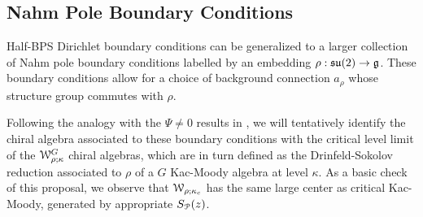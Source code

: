 \documentclass[11pt,a4paper]{article}
\begin{document}
%

\subsection{Nahm Pole Boundary Conditions}\label{nbc}

Half-BPS Dirichlet boundary conditions can be generalized to a larger collection of Nahm pole boundary conditions labelled by an embedding 
$\rho:\mathfrak{su}(2)\to{\mathfrak g}$. These boundary conditions allow for a choice of background connection $a_\rho$ whose structure group commutes with $\rho$. 

Following the analogy with the $\Psi \neq 0$ results in \cite{Gaiotto:2017euk}, we will tentatively identify the chiral algebra 
associated to these boundary conditions with the critical level limit of the ${\cal W}^G_{\rho;\kappa}$ chiral algebras, 
which are in turn defined as the Drinfeld-Sokolov reduction associated to $\rho$ of a $G$ Kac-Moody algebra at level $\kappa$. 
As a basic check of this proposal, we observe that ${\cal W}_{\rho;\kappa_c}$ has the same large center as critical Kac-Moody, 
generated by appropriate $S_{\cal P}(z)$.
\end{document}
